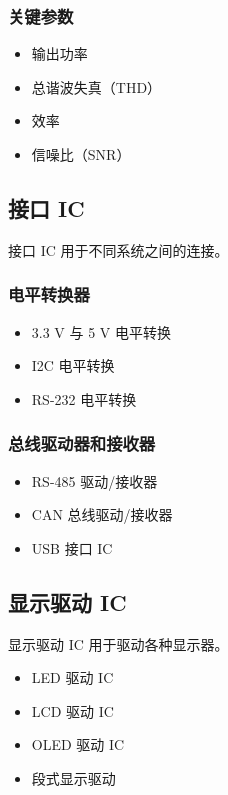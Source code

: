 \subsubsection{关键参数}

\begin{itemize}
  \item 输出功率
  \item 总谐波失真（THD）
  \item 效率
  \item 信噪比（SNR）
\end{itemize}

\subsection{接口 IC}

接口 IC 用于不同系统之间的连接。

\subsubsection{电平转换器}

\begin{itemize}
  \item 3.3 V 与 5 V 电平转换
  \item I2C 电平转换
  \item RS-232 电平转换
\end{itemize}

\subsubsection{总线驱动器和接收器}

\begin{itemize}
  \item RS-485 驱动/接收器
  \item CAN 总线驱动/接收器
  \item USB 接口 IC
\end{itemize}

\subsection{显示驱动 IC}

显示驱动 IC 用于驱动各种显示器。

\begin{itemize}
  \item LED 驱动 IC
  \item LCD 驱动 IC
  \item OLED 驱动 IC
  \item 段式显示驱动
\end{itemize}

